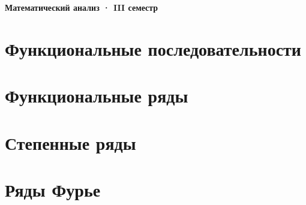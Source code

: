 \documentclass[10pt,a4paper]{article}
\begin{document}
\thispagestyle{empty}
\begin{center}
  {\LARGE\bfseries Математический анализ · III семестр}
\end{center}
\vspace{12pt}
\tableofcontents

\part{Функциональные последовательности}\label{sec-sequences}



\part{Функциональные ряды}\label{sec-series}





\part{Степенные ряды}\label{sec-power-series}






\part{Ряды Фурье}\label{sec-fourier}



\end{document}
